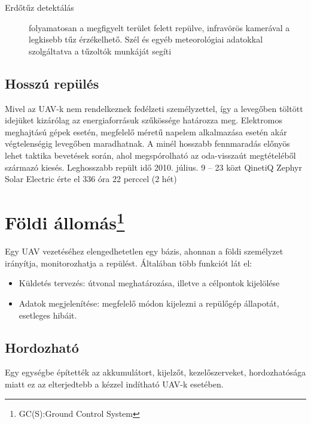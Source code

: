 \documentclass[12pt]{article}
\begin{document}
\begin{itemize}
\begin{description}
\item[Erd\H{o}t\H{u}z detektálás] folyamatosan a megfigyelt terület felett repülve, infravörös kamerával a legkisebb t\H{u}z érzékelhet\H{o}. Szél és egyéb meteorológiai adatokkal szolgáltatva a t\H{u}zoltók munkáját segíti

\end{description}

\subsection{Hosszú repülés}
Mivel az UAV-k nem rendelkeznek fedélzeti személyzettel, így a leveg\H{o}ben töltött idejüket kizárólag az energiaforrásuk sz\H{u}kössége határozza meg. Elektromos meghajtású gépek esetén, megfelel\H{o} méret\H{u} napelem alkalmazása esetén akár végtelenségig leveg\H{o}ben maradhatnak. A minél hosszabb fennmaradás el\H{o}nyös lehet taktika bevetések során, ahol megspórolható az oda-visszaút megtételéb\H{o}l származó kiesés. 
Leghosszabb repült id\H{o} 2010. július. 9 -- 23 közt QinetiQ Zephyr Solar Electric érte el 336 óra 22 perccel (2 hét)

\section{Földi állomás\footnote{GC(S):Ground Control System}}
Egy UAV vezetéséhez elengedhetetlen egy bázis, ahonnan a földi személyzet irányítja, monitorozhatja a repülést. Általában több funkciót lát el:
\begin{itemize}
\item Küldetés tervezés: útvonal meghatározása, illetve a célpontok kijelölése
\item Adatok megjelenítése: megfelel\H{o} módon kijelezni a repül\H{o}gép állapotát, esetleges hibáit.
\end{itemize}

\subsection{Hordozható}
Egy egységbe építették az akkumulátort, kijelz\H{o}t, kezel\H{o}szerveket, hordozhatósága miatt ez az elterjedtebb a kézzel indítható UAV-k esetében.


\end{itemize}
\end{document}
